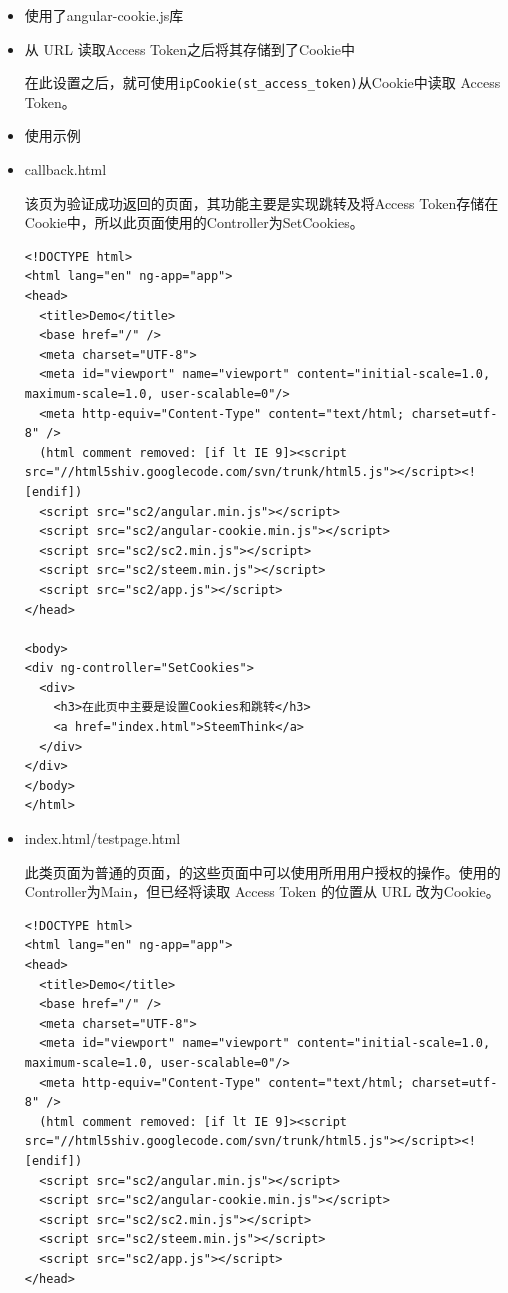 \documentclass[]{ctexbook}
\begin{document}
\begin{itemize}
\item
  使用了angular-cookie.js库
\item
  从 URL 读取Access Token之后将其存储到了Cookie中

  在此设置之后，就可使用\texttt{ipCookie(\textquotesingle{}st\_access\_token\textquotesingle{})}从Cookie中读取 Access Token。
\item
  使用示例
\item
  callback.html

  该页为验证成功返回的页面，其功能主要是实现跳转及将Access Token存储在Cookie中，所以此页面使用的Controller为SetCookies。

\begin{verbatim}
<!DOCTYPE html>
<html lang="en" ng-app="app">
<head>
  <title>Demo</title>
  <base href="/" />
  <meta charset="UTF-8">
  <meta id="viewport" name="viewport" content="initial-scale=1.0, maximum-scale=1.0, user-scalable=0"/>
  <meta http-equiv="Content-Type" content="text/html; charset=utf-8" />
  (html comment removed: [if lt IE 9]><script src="//html5shiv.googlecode.com/svn/trunk/html5.js"></script><![endif])
  <script src="sc2/angular.min.js"></script>
  <script src="sc2/angular-cookie.min.js"></script>
  <script src="sc2/sc2.min.js"></script>
  <script src="sc2/steem.min.js"></script>
  <script src="sc2/app.js"></script>  
</head>

<body>
<div ng-controller="SetCookies">
  <div>
    <h3>在此页中主要是设置Cookies和跳转</h3>
    <a href="index.html">SteemThink</a>   
  </div>
</div>
</body>
</html>
\end{verbatim}
\item
  index.html/testpage.html

  此类页面为普通的页面，的这些页面中可以使用所用用户授权的操作。使用的Controller为Main，但已经将读取 Access Token 的位置从 URL 改为Cookie。

\begin{verbatim}
<!DOCTYPE html>
<html lang="en" ng-app="app">
<head>
  <title>Demo</title>
  <base href="/" />
  <meta charset="UTF-8">
  <meta id="viewport" name="viewport" content="initial-scale=1.0, maximum-scale=1.0, user-scalable=0"/>
  <meta http-equiv="Content-Type" content="text/html; charset=utf-8" />
  (html comment removed: [if lt IE 9]><script src="//html5shiv.googlecode.com/svn/trunk/html5.js"></script><![endif])
  <script src="sc2/angular.min.js"></script>
  <script src="sc2/angular-cookie.min.js"></script>
  <script src="sc2/sc2.min.js"></script>
  <script src="sc2/steem.min.js"></script>
  <script src="sc2/app.js"></script>
</head>


\end{verbatim}
\end{itemize}
\end{document}
